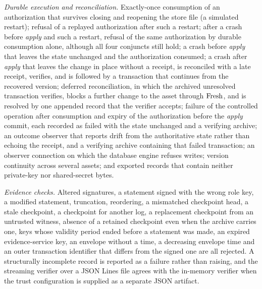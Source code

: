 \emph{Durable execution and reconciliation.} Exactly-once consumption of an authorization that survives closing and reopening the store file (a simulated restart); refusal of a replayed authorization after such a restart; after a crash before \emph{apply} and such a restart, refusal of the same authorization by durable consumption alone, although all four conjuncts still hold; a crash before \emph{apply} that leaves the state unchanged and the authorization consumed; a crash after \emph{apply} that leaves the change in place without a receipt, is reconciled with a late receipt, verifies, and is followed by a transaction that continues from the recovered version; deferred reconciliation, in which the archived unresolved transaction verifies, blocks a further change to the asset through $\mathrm{Fresh}$, and is resolved by one appended record that the verifier accepts; failure of the controlled operation after consumption and expiry of the authorization before the \emph{apply} commit, each recorded as failed with the state unchanged and a verifying archive; an outcome observer that reports drift from the authoritative state rather than echoing the receipt, and a verifying archive containing that failed transaction; an observer connection on which the database engine refuses writes; version continuity across several assets; and exported records that contain neither private-key nor shared-secret bytes.

\emph{Evidence checks.} Altered signatures, a statement signed with the wrong role key, a modified statement, truncation, reordering, a mismatched checkpoint head, a stale checkpoint, a checkpoint for another log, a replacement checkpoint from an untrusted witness, absence of a retained checkpoint even when the archive carries one, keys whose validity period ended before a statement was made, an expired evidence-service key, an envelope without a time, a decreasing envelope time and an outer transaction identifier that differs from the signed one are all rejected. A structurally incomplete record is reported as a failure rather than raising, and the streaming verifier over a JSON Lines file agrees with the in-memory verifier when the trust configuration is supplied as a separate JSON artifact.

